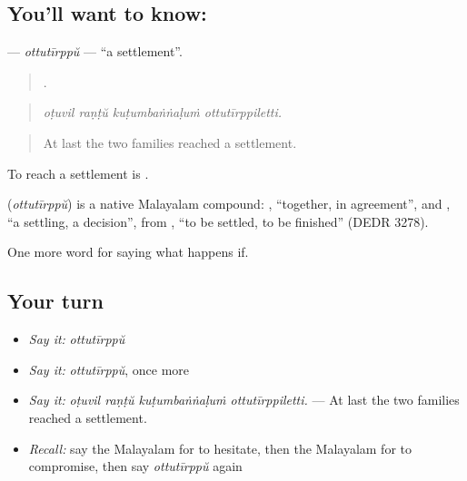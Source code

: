 \subsection*{You'll want to know: }
\textbf{} — \emph{ottutīrppŭ} — \textquotedblleft{}a settlement\textquotedblright{}.

\begin{quote}
   .
\end{quote}

\begin{quote}
\emph{oṭuvil raṇṭŭ kuṭumbaṅṅaḷuṁ ottutīrppiletti.}
\end{quote}

\begin{quote}
At last the two families reached a settlement.
\end{quote}

To reach a settlement is .

\begin{cousinweb}
\textbf{} (\emph{ottutīrppŭ}) is a native Malayalam compound: , \textquotedblleft{}together, in agreement\textquotedblright{}, and , \textquotedblleft{}a settling, a decision\textquotedblright{}, from , \textquotedblleft{}to be settled, to be finished\textquotedblright{} (DEDR 3278).
\end{cousinweb}

\begin{grammarlens}[title={What you've built}]
One more word for saying what happens if.
\end{grammarlens}

\subsection*{Your turn}
\begin{itemize}
\raggedright
  \item \emph{Say it:} \emph{ottutīrppŭ}
  \item \emph{Say it:} \emph{ottutīrppŭ}, once more
  \item \emph{Say it:} \emph{oṭuvil raṇṭŭ kuṭumbaṅṅaḷuṁ ottutīrppiletti.} — At last the two families reached a settlement.
  \item \emph{Recall:} say the Malayalam for to hesitate, then the Malayalam for to compromise, then say \emph{ottutīrppŭ} again
\end{itemize}

